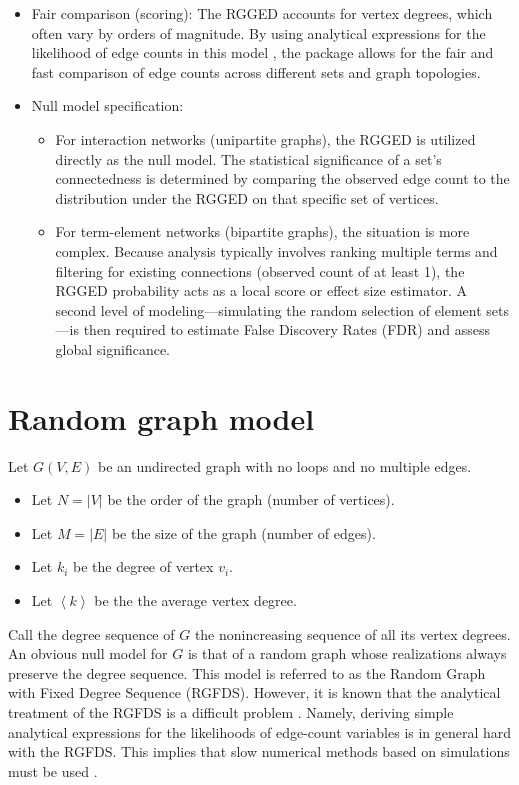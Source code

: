 \documentclass{article}\usepackage[]{graphicx}\usepackage[]{xcolor}
\begin{document}
\begin{itemize}
    \item Fair comparison (scoring): The RGGED accounts for vertex degrees, which often vary by orders of magnitude. By using analytical expressions for the likelihood of edge counts in this model \cite{JCB}, the package allows for the fair and fast comparison of edge counts across different sets and graph topologies.
    \item Null model specification:
    \begin{itemize}
        \item For interaction networks (unipartite graphs), the RGGED is utilized directly as the null model. The statistical significance of a set's connectedness is determined by comparing the observed edge count to the distribution under the RGGED on that specific set of vertices.
        \item For term-element networks (bipartite graphs), the situation is more complex. Because analysis typically involves ranking multiple terms and filtering for existing connections (observed count of at least 1), the RGGED probability acts as a local score or effect size estimator. A second level of modeling—simulating the random selection of element sets—is then required to estimate False Discovery Rates (FDR) and assess global significance.
    \end{itemize}
\end{itemize}

\section{Random graph model}

Let $G(V, E)$ be an undirected graph with no loops and no multiple edges.
\begin{itemize}
    \item Let $N = |V|$ be the order of the graph (number of vertices).
    \item Let $M = |E|$ be the size of the graph (number of edges).
    \item Let $k_i$ be the degree of vertex $v_i$.
    \item Let $\left< k \right>$ be the the average vertex degree.
\end{itemize}

Call the degree sequence of $G$ the nonincreasing sequence of all its vertex degrees. An obvious null model for $G$ is that of a random graph whose realizations always preserve the degree sequence. This model is referred to as the Random Graph with Fixed Degree Sequence (RGFDS). However, it is known that the analytical treatment of the RGFDS is a difficult problem \cite{bender1978asymptotic, molloy1995critical, itzkovitz2003subgraphs, park2004statistical}. Namely, deriving simple analytical expressions for the likelihoods of edge-count variables is in general hard with the RGFDS. This implies that slow numerical methods based on simulations must be used \cite{maslov2002specificity, milo2002network, milo2003uniform}.
\end{document}
